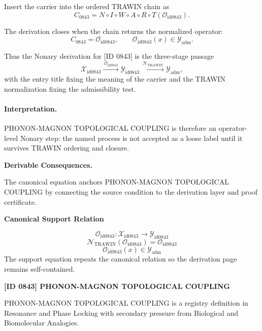 Insert the carrier into the ordered TRAWIN chain as\[
C_{0843}=N\circ I\circ W\circ A\circ R\circ T(\mathcal{O}_{\mathrm{id0843}}).
\]

The derivation closes when the chain returns the normalized operator:\[
C_{0843}=\mathcal{O}_{\mathrm{id0843}},\qquad \mathcal{O}_{\mathrm{id0843}}(x)\in\mathcal{Y}_{\mathrm{adm}}.
\]

Thus the Nonary derivation for [ID 0843] is the three-stage passage
\[
\mathcal{X}_{\mathrm{id0843}}\xrightarrow{\,\mathcal{O}_{\mathrm{id0843}}\,} \mathcal{Y}_{\mathrm{id0843}}\xrightarrow{\,\mathcal{N}_{\mathrm{TRAWIN}}\,} \mathcal{Y}_{\mathrm{adm}},
\]
with the entry title fixing the meaning of the carrier and the TRAWIN normalization fixing the admissibility test.

\paragraph{Interpretation.} PHONON-MAGNON TOPOLOGICAL COUPLING is therefore an operator-level Nonary step: the named process is not accepted as a loose label until it survives TRAWIN ordering and closure.

\par\vspace{0.35em}
\noindent\textbf{Derivable Consequences.}\quad
\begingroup
\footnotesize
\raggedright
The canonical equation anchors PHONON-MAGNON TOPOLOGICAL COUPLING by connecting the source condition to the derivation layer and proof certificate.
\par\endgroup

\noindent\textbf{Canonical Support Relation}\par
\[
\mathcal{O}_{\mathrm{id0843}}:\mathcal{X}_{\mathrm{id0843}}\longrightarrow\mathcal{Y}_{\mathrm{id0843}}
\]
\[
\mathcal{N}_{\mathrm{TRAWIN}}(\mathcal{O}_{\mathrm{id0843}})=\mathcal{O}_{\mathrm{id0843}}
\]
\[
\mathcal{O}_{\mathrm{id0843}}(x)\in\mathcal{Y}_{\mathrm{adm}}
\]
\noindent The support equation repeats the canonical relation so the derivation page remains self-contained.\par

\clearpage
\noindent\textbf{[ID 0843] PHONON-MAGNON TOPOLOGICAL COUPLING}\par
\vspace{0.35em}
\begingroup\small
{}
PHONON-MAGNON TOPOLOGICAL COUPLING is a registry definition in Resonance and Phase Locking with secondary pressure from Biological and Biomolecular Analogies.

